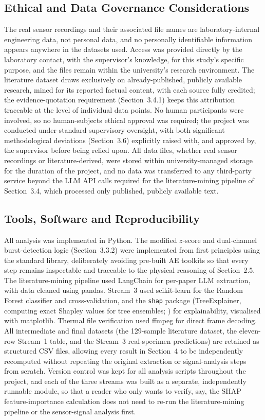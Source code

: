 \documentclass[a4paper]{article}
\begin{document}
\subsection{Ethical and Data Governance Considerations}
The real sensor recordings and their associated file names are laboratory-internal engineering data, not personal data, and no personally identifiable information appears anywhere in the datasets used. Access was provided directly by the laboratory contact, with the supervisor's knowledge, for this study's specific purpose, and the files remain within the university's research environment. The literature dataset draws exclusively on already-published, publicly available research, mined for its reported factual content, with each source fully credited; the evidence-quotation requirement (Section~3.4.1) keeps this attribution traceable at the level of individual data points. No human participants were involved, so no human-subjects ethical approval was required; the project was conducted under standard supervisory oversight, with both significant methodological deviations (Section~3.6) explicitly raised with, and approved by, the supervisor before being relied upon. All data files, whether real sensor recordings or literature-derived, were stored within university-managed storage for the duration of the project, and no data was transferred to any third-party service beyond the LLM API calls required for the literature-mining pipeline of Section~3.4, which processed only published, publicly available text.

\subsection{Tools, Software and Reproducibility}
All analysis was implemented in Python. The modified $z$-score and dual-channel burst-detection logic (Section~3.3.2) were implemented from first principles using the standard library, deliberately avoiding pre-built AE toolkits so that every step remains inspectable and traceable to the physical reasoning of Section~2.5. The literature-mining pipeline used LangChain for per-paper LLM extraction, with data cleaned using pandas. Stream~3 used scikit-learn for the Random Forest classifier and cross-validation, and the \texttt{shap} package (TreeExplainer, computing exact Shapley values for tree ensembles; \citealt{lundberg2017}) for explainability, visualised with matplotlib. Thermal file verification used ffmpeg for direct frame decoding. All intermediate and final datasets (the 129-sample literature dataset, the eleven-row Stream~1 table, and the Stream~3 real-specimen predictions) are retained as structured CSV files, allowing every result in Section~4 to be independently recomputed without repeating the original extraction or signal-analysis steps from scratch. Version control was kept for all analysis scripts throughout the project, and each of the three streams was built as a separate, independently runnable module, so that a reader who only wants to verify, say, the SHAP feature-importance calculation does not need to re-run the literature-mining pipeline or the sensor-signal analysis first.
\end{document}
